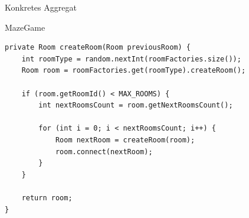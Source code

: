\begin{frame}[fragile]{Konkretes Aggregat}
	\begin{exampleblock}{MazeGame}
 		\begin{lstlisting}
private Room createRoom(Room previousRoom) {
    int roomType = random.nextInt(roomFactories.size());
    Room room = roomFactories.get(roomType).createRoom();
    
    if (room.getRoomId() < MAX_ROOMS) {
        int nextRoomsCount = room.getNextRoomsCount();
        
        for (int i = 0; i < nextRoomsCount; i++) {
            Room nextRoom = createRoom(room);
            room.connect(nextRoom);
        }
    }
    
    return room;
}
 		\end{lstlisting}
 	\end{exampleblock}
\end{frame}